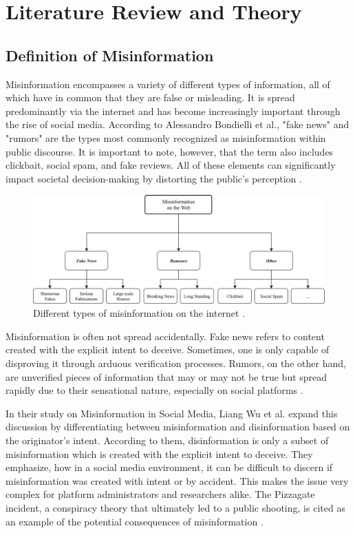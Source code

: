 \newpage
\section{Literature Review and Theory}
\subsection{Definition of Misinformation}

Misinformation encompasses a variety of different types of information, all of which have in common that they are false or misleading. It is spread predominantly via the internet and has become increasingly important through the rise of social media. According to Alessandro Bondielli et al., "fake news" and "rumors" are the types most commonly recognized as misinformation within public discourse. It is important to note, however, that the term also includes clickbait, social spam, and fake reviews. All of these elements can significantly impact societal decision-making by distorting the public's perception \cite{mi_alessandro_bondielli}. 

\begin{figure}[h]
    \centering
    \includegraphics[width=1\textwidth]{assets/Types_Of_MisInformation.jpg}
    \caption{Different types of misinformation on the internet \cite{mi_alessandro_bondielli}.}
    \label{fig:my_label}
\end{figure}

Misinformation is often not spread accidentally. Fake news refers to content created with the explicit intent to deceive. Sometimes, one is only capable of disproving it through arduous verification processes. Rumors, on the other hand, are unverified pieces of information that may or may not be true but spread rapidly due to their sensational nature, especially on social platforms \cite{mi_alessandro_bondielli}.

In their study on Misinformation in Social Media, Liang Wu et al. expand this discussion by differentiating between misinformation and disinformation based on the originator's intent. According to them, disinformation is only a subset of misinformation which is created with the explicit intent to deceive. They emphasize, how in a social media environment, it can be difficult to discern if misinformation was created with intent or by accident. This makes the issue very complex for platform administrators and researchers alike. The Pizzagate incident, a conspiracy theory that ultimately led to a public shooting, is cited as an example of the potential consequences of misinformation \cite{mi_liang_wu}.

